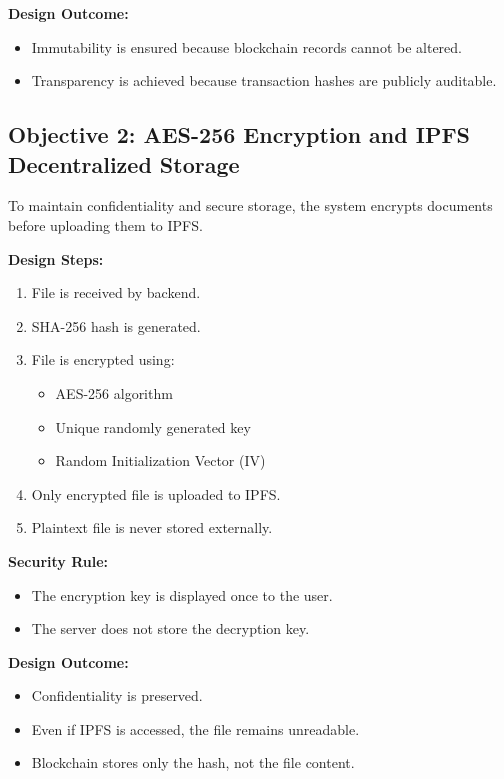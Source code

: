 \documentclass[12pt]{article}
\begin{document}
\textbf{Design Outcome:}

\begin{itemize}
\item Immutability is ensured because blockchain records cannot be altered.
\item Transparency is achieved because transaction hashes are publicly auditable.
\end{itemize}

\subsection{Objective 2: AES-256 Encryption and IPFS Decentralized Storage}

To maintain confidentiality and secure storage, the system encrypts documents before uploading them to IPFS.\cite{jisem2023}

\textbf{Design Steps:}

\begin{enumerate}
\item File is received by backend.
\item SHA-256 hash is generated.
\item File is encrypted using:
\begin{itemize}
\item AES-256 algorithm
\item Unique randomly generated key
\item Random Initialization Vector (IV)
\end{itemize}
\item Only encrypted file is uploaded to IPFS.
\item Plaintext file is never stored externally.
\end{enumerate}

\textbf{Security Rule:}

\begin{itemize}
\item The encryption key is displayed once to the user.
\item The server does not store the decryption key.
\end{itemize}

\textbf{Design Outcome:}

\begin{itemize}
\item Confidentiality is preserved.
\item Even if IPFS is accessed, the file remains unreadable.
\item Blockchain stores only the hash, not the file content.
\end{itemize}
\end{document}
